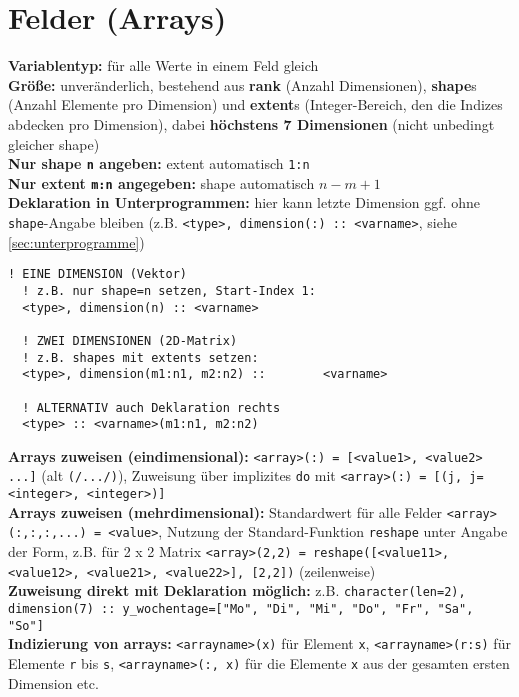 \documentclass[a4paper, twocolumn]{scrarticle}
\begin{document}
\section{Felder (Arrays)}
\textbf{Variablentyp:} für alle Werte in einem Feld  gleich\\
\textbf{Größe:} unveränderlich, bestehend aus \textbf{rank} (Anzahl Dimensionen), \textbf{shape}s (Anzahl Elemente pro Dimension) und \textbf{extent}s (Integer-Bereich, den die Indizes abdecken pro Dimension), dabei \textbf{höchstens 7 Dimensionen} (nicht unbedingt gleicher shape)\\
\textbf{Nur shape \lstinline|n| angeben:} extent automatisch \lstinline|1:n|\\
\textbf{Nur extent \lstinline|m:n| angegeben:} shape automatisch $n-m+1$\\
\textbf{Deklaration in Unterprogrammen:} hier kann letzte Dimension ggf. ohne \lstinline|shape|-Angabe bleiben (z.B. \lstinline|<type>, dimension(:) :: <varname>|, siehe \cref{sec:unterprogramme})
\begin{lstlisting}[caption={\bfseries Deklarationsmöglichkeiten für arrays}]
  ! EINE DIMENSION (Vektor)
  ! z.B. nur shape=n setzen, Start-Index 1:
  <type>, dimension(n) :: <varname>
  
  ! ZWEI DIMENSIONEN (2D-Matrix)
  ! z.B. shapes mit extents setzen:
  <type>, dimension(m1:n1, m2:n2) ::        <varname>
  
  ! ALTERNATIV auch Deklaration rechts
  <type> :: <varname>(m1:n1, m2:n2)
\end{lstlisting}
\textbf{Arrays zuweisen (eindimensional):} \lstinline|<array>(:) = [<value1>, <value2> ...]| (alt \lstinline|(/.../)|), Zuweisung über implizites \lstinline|do| mit \lstinline|<array>(:) = [(j, j=<integer>, <integer>)]|\\
\textbf{Arrays zuweisen (mehrdimensional):} Standardwert für alle Felder \lstinline|<array>(:,:,:,...) = <value>|, Nutzung der Standard-Funktion \lstinline|reshape| unter Angabe der Form, z.B. für 2 x 2 Matrix \lstinline|<array>(2,2) = reshape([<value11>, <value12>, <value21>, <value22>], [2,2])| (zeilenweise)\\
\textbf{Zuweisung direkt mit Deklaration möglich:} z.B. \lstinline|character(len=2), dimension(7) :: y_wochentage=["Mo", "Di", "Mi", "Do", "Fr", "Sa", "So"]|\\
\textbf{Indizierung von arrays:} \lstinline|<arrayname>(x)| für Element \lstinline|x|, \lstinline|<arrayname>(r:s)| für Elemente \lstinline|r| bis \lstinline|s|, \lstinline|<arrayname>(:, x)| für die Elemente \lstinline|x| aus der gesamten ersten Dimension etc.\\
\end{document}
